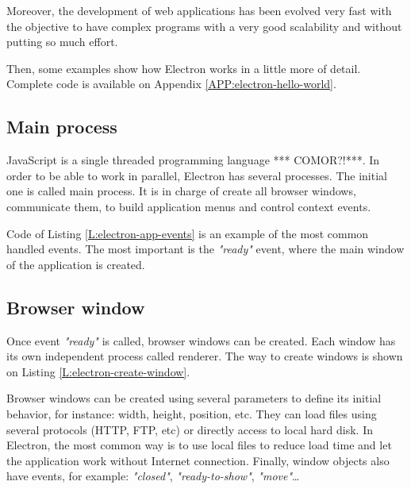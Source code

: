 Moreover, the development of web applications has been evolved very fast with
the objective to have complex programs with a very good scalability and without
putting so much effort.

Then, some examples show how Electron works in a little more of detail.
Complete code is available on Appendix \ref{APP:electron-hello-world}.

\subsection{Main process}

JavaScript is a single threaded programming language *** COMOR?!***. In order to be able to
work in parallel, Electron has several processes. The initial one is called 
main process. It is in charge of create all browser windows, communicate them,
to build application menus and control context events.

\begin{codefigure}
\end{codefigure}

Code of Listing \ref{L:electron-app-events} is an example of the most common
handled events. The most important is the \textit{"ready"} event, where the
main window of the application is created.

\subsection{Browser window}

Once event \textit{"ready"} is called, browser windows can be created. Each
window has its own independent process called renderer. The way to create
windows is shown on Listing \ref{L:electron-create-window}.

\begin{codefigure}
\end{codefigure}

Browser windows can be created using several parameters to define its initial
behavior, for instance: width, height, position, etc. They can load files  
using several protocols (HTTP, FTP, etc) or directly access to local hard disk.
In Electron, the most common way is to use local files to reduce load time and
let the application work without Internet connection. Finally, window objects
also have events, for example: \textit{"closed"}, \textit{"ready-to-show"},
\textit{"move"}\dots

